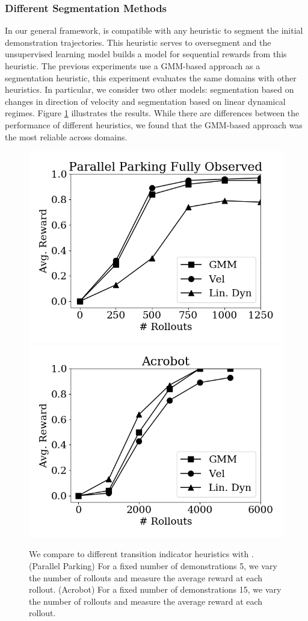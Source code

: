 \subsubsection{Different Segmentation Methods}
In our general framework, \hirl is compatible with any heuristic to segment the initial demonstration trajectories. This heuristic serves to oversegment and the unsupervised learning model builds a model for sequential rewards from this heuristic. The previous experiments use a GMM-based approach as a segmentation heuristic, this experiment evaluates the same domains with other heuristics. In particular, we consider two other models: segmentation based on changes in direction of velocity and segmentation based on linear dynamical regimes. Figure \ref{exp:seg} illustrates the results. While there are differences between the performance of different heuristics, we found that the GMM-based approach was the most reliable across domains.

\begin{figure}[ht!]
\centering
 \includegraphics[width=0.48\columnwidth]{swirl-experiments/ppfo-seg1.png}
 \includegraphics[width=0.48\columnwidth]{swirl-experiments/ppfo-seg2.png}
 \caption{We compare to different transition indicator heuristics with \hirl.  (Parallel Parking) For a fixed number of demonstrations 5, we vary the number of rollouts and measure the average reward at each rollout.  (Acrobot) For a fixed number of demonstrations 15, we vary the number of rollouts and measure the average reward at each rollout. \label{exp:seg}}
\end{figure}




